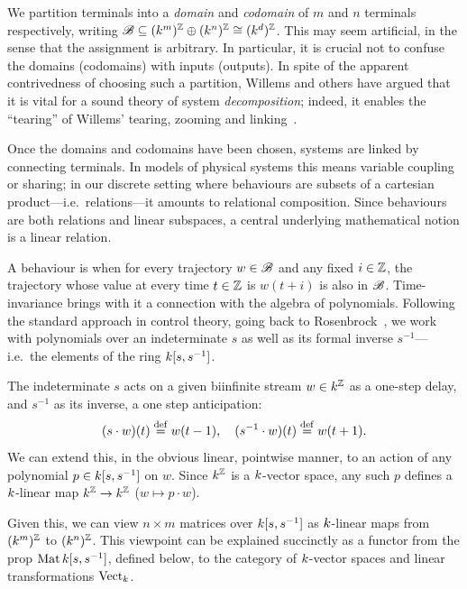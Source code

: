 We partition terminals into a \emph{domain} and \emph{codomain} of $m$ and $n$
terminals respectively, writing ${\mathscr B} \subseteq (k^m)^{\mathbb Z} \oplus (k^n)^{\mathbb Z} \cong
(k^d)^{\mathbb Z}$.  This may seem artificial, in the sense that the assignment is
arbitrary.  In particular, it is crucial not to confuse the domains (codomains)
with inputs (outputs). In spite of the apparent contrivedness of choosing such a
partition, Willems and others have argued that it is vital for a sound theory of
system \emph{decomposition}; indeed, it enables the ``tearing'' of Willems'
tearing, zooming and linking~\cite{Wi}.

Once the domains and codomains have been chosen, systems are linked by
connecting terminals. In models of physical systems this means variable coupling
or sharing; in our discrete setting where behaviours are subsets of a
cartesian product---i.e.\ relations---it amounts to relational composition.
Since behaviours are both relations and linear subspaces, a central underlying
mathematical notion is a linear relation.  

\smallskip
A behaviour is  when for every trajectory $w \in {\mathscr B}$ and
any fixed $i\in{\mathbb Z}$, the trajectory whose value at every time $t\in{\mathbb Z}$ is
$w(t+i)$ is also in ${\mathscr B}$.  
%
Time-invariance brings with it a connection with the algebra of polynomials.
Following the standard approach in control theory, going back to
Rosenbrock~\cite{Ro}, we work with polynomials over an indeterminate $s$ as well
as its formal inverse $s^{-1}$---i.e.\ the elements of the ring
${k[s,s^{-1}]}$.

The indeterminate $s$ acts on a given biinfinite stream $w \in k^{\mathbb Z}$ as a
one-step delay, and $s^{-1}$ as its inverse, a one step anticipation: 
\[ 
  (s\cdot w) (t) \stackrel{\mathrm{def}}{=} w(t-1),\quad (s^{-1}\cdot w)(t) \stackrel{\mathrm{def}}{=} w(t+1).
\]
We can extend this, in the obvious linear, pointwise manner, to an action of any
polynomial $p\in {k[s,s^{-1}]}$ on $w$.  Since $k^{\mathbb Z}$ is a $k$-vector space, any such
$p$ defines a $k$-linear map $k^{\mathbb Z}\to k^{\mathbb Z}$ ($w \mapsto p\cdot w$).

Given this, we can view $n\times m$ matrices over ${k[s,s^{-1}]}$ as $k$-linear maps from
$(k^m)^{\mathbb Z}$ to $(k^n)^{\mathbb Z}$. This viewpoint can be explained succinctly as a
functor from the prop $\operatorname{\mathrm{Mat}}{k[s,s^{-1}]}$, defined below, to the category of $k$-vector
spaces and linear transformations $\operatorname{\mathrm{Vect}}_k$.

